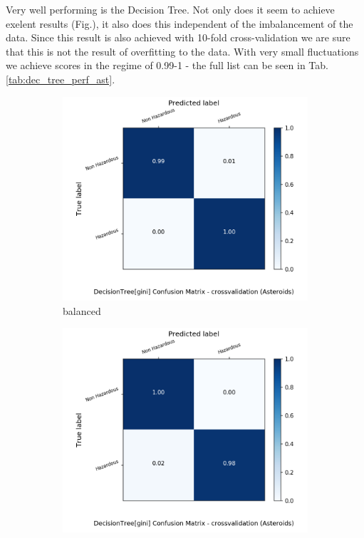 \documentclass{article}
\begin{document}
Very well performing is the Decision Tree. Not only does it seem to achieve exelent results (Fig.), it also does this independent of the imbalancement of the data. Since this result is also achieved with 10-fold cross-validation we are sure that this is not the result of overfitting to the data. With very small fluctuations we achieve scores in the regime of 0.99-1 - the full list can be seen in Tab.\ref{tab:dec_tree_perf_ast}.


\begin{figure}[h!]
	\centering
	\begin{subfigure}{.5\textwidth}
		\centering
		\includegraphics[width=1.1\textwidth]{Plots/asteroids/asteroids_DecisionTree_gini_balance_True_crossvalidation.png}
		\caption{balanced}
	\end{subfigure}%
	\begin{subfigure}{.5\textwidth}
		\centering
		\includegraphics[width=1.1\textwidth]{Plots/asteroids/asteroids_DecisionTree_gini_balance_False_crossvalidation.png}

\end{subfigure}
\end{figure}
\end{document}
